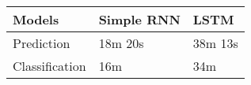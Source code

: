 

\begin{center}
    \begin{tabular}{| l | l | l |}
    \hline
    Models         & Simple RNN & LSTM   \\ \hline
    Prediction     & 18m 20s    & 38m 13s \\ \hline
    Classification & 16m        & 34m   \\ \hline
    \end{tabular}
\end{center}